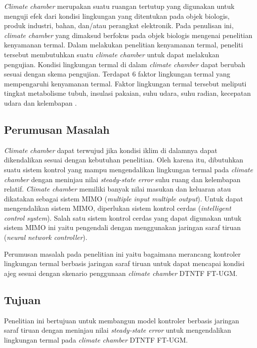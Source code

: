\documentclass[a4paper,10pt]{article}
\newenvironment{body}{\begin{multicols}{2}}{\end{multicols}}
\begin{document}
\begin{body}
		\vspace{1mm}
		
		\textit{Climate chamber} merupakan suatu ruangan tertutup yang digunakan untuk menguji efek dari kondisi lingkungan yang ditentukan pada objek biologis, produk industri, bahan, dan/atau perangkat elektronik. Pada penulisan ini, \textit{climate chamber} yang dimaksud berfokus pada objek biologis mengenai penelitian kenyamanan termal. Dalam melakukan penelitian kenyamanan termal, peneliti tersebut membutuhkan suatu \textit{climate chamber} untuk dapat melakukan pengujian. Kondisi lingkungan termal di dalam \textit{climate chamber} dapat berubah sesuai dengan skema pengujian. Terdapat 6 faktor lingkungan termal yang mempengaruhi kenyamanan termal. Faktor lingkungan termal tersebut meliputi tingkat metabolisme tubuh, insulasi pakaian, suhu udara, suhu radian, kecepatan udara dan kelembapan \cite{ASHRAE55}.\\
		
		\subsection{Perumusan Masalah}
		
		\textit{Climate chamber} dapat terwujud jika kondisi iklim di dalamnya dapat dikendalikan sesuai dengan kebutuhan penelitian. Oleh karena itu, dibutuhkan suatu sistem kontrol yang mampu mengendalikan lingkungan termal pada \textit{climate chamber} dengan meninjau nilai \textit{steady-state error} suhu ruang dan kelembapan relatif. \textit{Climate chamber} memiliki banyak nilai masukan dan keluaran atau dikatakan sebagai sistem MIMO (\textit{multiple input multiple output}). Untuk dapat mengendalikan sistem MIMO, diperlukan sistem kontrol cerdas (\textit{intelligent control system}). Salah satu sistem kontrol cerdas yang dapat digunakan untuk sistem MIMO ini yaitu pengendali dengan menggunakan jaringan saraf tiruan (\textit{neural network controller}).
		
		Perumusan masalah pada penelitian ini yaitu bagaimana merancang kontroler lingkungan termal berbasis jaringan saraf tiruan untuk dapat mencapai kondisi ajeg sesuai dengan skenario penggunaan \textit{climate chamber} DTNTF FT-UGM.\\
		
		\subsection{Tujuan}
		Penelitian ini bertujuan untuk membangun model kontroler berbasis jaringan saraf tiruan dengan meninjau nilai \textit{steady-state error} untuk mengendalikan lingkungan termal pada \textit{climate chamber} DTNTF FT-UGM.\\
		

\end{body}
\end{document}
